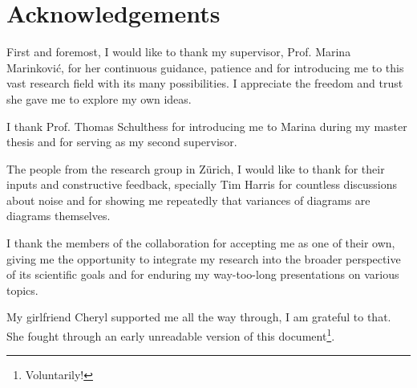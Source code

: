 
\bigskip

\begingroup
\let\clearpage\relax
\let\cleardoublepage\relax
\let\cleardoublepage\relax
\chapter*{Acknowledgements}

\def\thanks#1{%
\begingroup
\leftskip1em
\noindent #1
\par
\endgroup
}



First and foremost, I would like to thank my supervisor, Prof. Marina Marinković, for her continuous guidance, patience and for introducing me to this vast research field with its many possibilities.
I appreciate the freedom and trust she gave me to explore my own ideas.

I thank Prof. Thomas Schulthess for introducing me to Marina during my master thesis and for serving as my second supervisor.

The people from the research group in Zürich, I would like to thank for their inputs and constructive feedback, specially Tim Harris for countless discussions about noise and for showing me repeatedly that variances of diagrams are diagrams themselves.

I thank the members of the \RCstar collaboration for accepting me as one of their own, giving me the opportunity to integrate my research into the broader perspective of its scientific goals and for enduring my way-too-long presentations on various topics.

My girlfriend Cheryl supported me all the way through, I am grateful to that.
She fought through an early unreadable version of this document\footnote{Voluntarily!}.

